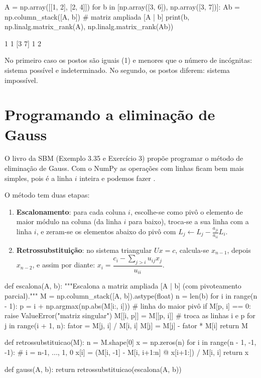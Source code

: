 \begin{entrada}
A = np.array([[1, 2], [2, 4]])
for b in [np.array([3, 6]), np.array([3, 7])]:
    Ab = np.column_stack([A, b])            # matriz ampliada [A | b]
    print(b, np.linalg.matrix_rank(A), np.linalg.matrix_rank(Ab))
\end{entrada}
\begin{saida}
[3 6] 1 1
[3 7] 1 2
\end{saida}

No primeiro caso os postos são iguais (1) e menores que o número de incógnitas: sistema possível e
indeterminado. No segundo, os postos diferem: sistema impossível.

\section{Programando a eliminação de Gauss}

O livro da SBM (Exemplo 3.35 e Exercício 3) propõe programar o método de eliminação de Gauss. Com o NumPy as
operações com linhas ficam bem mais simples, pois  é a linha $i$ inteira e podemos fazer
.

O método tem duas etapas:
\begin{enumerate}
  \item \textbf{Escalonamento}: para cada coluna $i$, escolhe-se como pivô o elemento de maior módulo na coluna
  (da linha $i$ para baixo), troca-se a sua linha com a linha $i$, e zeram-se os elementos abaixo do pivô com
  $L_j \leftarrow L_j - \frac{a_{ji}}{a_{ii}}L_i$.
  \item \textbf{Retrossubstituição}: no sistema triangular $Ux=c$, calcula-se $x_{n-1}$, depois $x_{n-2}$, e assim
  por diante: $x_i=\dfrac{c_i-\sum_{j>i}u_{ij}x_j}{u_{ii}}$.
\end{enumerate}

\begin{entrada}
def escalona(A, b):
    """Escalona a matriz ampliada [A | b] (com pivoteamento parcial)."""
    M = np.column_stack([A, b]).astype(float)
    n = len(b)
    for i in range(n - 1):
        p = i + np.argmax(np.abs(M[i:, i]))   # linha do maior pivô
        if M[p, i] == 0:
            raise ValueError("matriz singular")
        M[[i, p]] = M[[p, i]]                 # troca as linhas i e p
        for j in range(i + 1, n):
            fator = M[j, i] / M[i, i]
            M[j] = M[j] - fator * M[i]
    return M

def retrossubstituicao(M):
    n = M.shape[0]
    x = np.zeros(n)
    for i in range(n - 1, -1, -1):            # i = n-1, ..., 1, 0
        x[i] = (M[i, -1] - M[i, i+1:n] @ x[i+1:]) / M[i, i]
    return x

def gauss(A, b):
    return retrossubstituicao(escalona(A, b))
\end{entrada}

